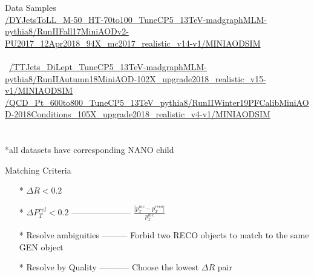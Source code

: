 \documentclass[10pt,handout]{beamer}
\begin{document}
\begin{frame}{Data Samples}
\\
 \url{/DYJetsToLL_M-50_HT-70to100_TuneCP5_13TeV-madgraphMLM-pythia8/RunIIFall17MiniAODv2-PU2017_12Apr2018_94X_mc2017_realistic_v14-v1/MINIAODSIM}\\
\quad \quad \\\
 \url{/TTJets_DiLept_TuneCP5_13TeV-madgraphMLM-pythia8/RunIIAutumn18MiniAOD-102X_upgrade2018_realistic_v15-v1/MINIAODSIM}\\

\url{/QCD_Pt_600to800_TuneCP5_13TeV_pythia8/RunIIWinter19PFCalibMiniAOD-2018Conditions_105X_upgrade2018_realistic_v4-v1/MINIAODSIM}\\


\quad \quad \\
\quad \quad \\
\scriptsize
*all datasets have corresponding NANO child
\end{frame}
\begin{frame}{Matching Criteria}

\begin{itemize}
\item[*] $\Delta R < 0.2$
\item[*] $\Delta P_T^{rel} < 0.2$  ---------------------  $\frac{|p_T^{mc} - p_T^{reco}|}{p_T^{mc}}$
\item[*] Resolve ambiguities \quad  --------- Forbid two RECO objects to match to the same GEN object
\item[*] Resolve by Quality \quad ----------- Choose the lowest $\Delta R$ pair 

\end{itemize}

\end{frame}
\end{document}
